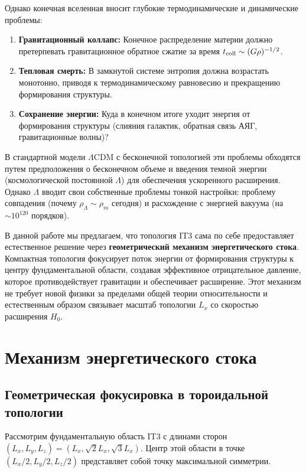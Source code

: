 \documentclass[12pt,a4paper]{article}
\begin{document}
Однако конечная вселенная вносит глубокие термодинамические и динамические проблемы:
\begin{enumerate}
    \item \textbf{Гравитационный коллапс:} Конечное распределение материи должно претерпевать гравитационное обратное сжатие за время $t_{\rm coll} \sim (G\rho)^{-1/2}$.
    \item \textbf{Тепловая смерть:} В замкнутой системе энтропия должна возрастать монотонно, приводя к термодинамическому равновесию и прекращению формирования структуры.
    \item \textbf{Сохранение энергии:} Куда в конечном итоге уходит энергия от формирования структуры (слияния галактик, обратная связь АЯГ, гравитационные волны)?
\end{enumerate}

В стандартной модели $\Lambda$CDM с бесконечной топологией эти проблемы обходятся путем предположения о бесконечном объеме и введения темной энергии (космологической постоянной $\Lambda$) для обеспечения ускоренного расширения. Однако $\Lambda$ вводит свои собственные проблемы тонкой настройки: проблему совпадения (почему $\rho_\Lambda \sim \rho_m$ сегодня) и расхождение с энергией вакуума (на $\sim 10^{120}$ порядков).

В данной работе мы предлагаем, что топология IT3 сама по себе предоставляет естественное решение через \textbf{геометрический механизм энергетического стока}. Компактная топология фокусирует поток энергии от формирования структуры к центру фундаментальной области, создавая эффективное отрицательное давление, которое противодействует гравитации и обеспечивает расширение. Этот механизм не требует новой физики за пределами общей теории относительности и естественным образом связывает масштаб топологии $L_x$ со скоростью расширения $H_0$.

\section{Механизм энергетического стока}

\subsection{Геометрическая фокусировка в тороидальной топологии}

Рассмотрим фундаментальную область IT3 с длинами сторон $(L_x, L_y, L_z) = (L_x, \sqrt{2}L_x, \sqrt{3}L_x)$. Центр этой области в точке $(L_x/2, L_y/2, L_z/2)$ представляет собой точку максимальной симметрии.
\end{document}
